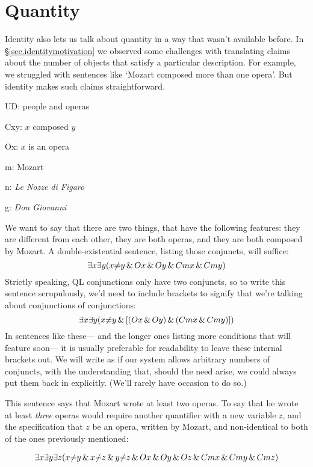\section{Quantity}
\label{sec.quantity}

Identity also lets us talk about quantity in a way that wasn't available before. In \S\ref{sec.identitymotivation} we observed some challenges with translating claims about the number of objects that satisfy a particular description. For example, we struggled with sentences like `Mozart composed more than one opera'. But identity makes such claims straightforward.

\begin{ekey}
\item[UD:] people and operas
\item[Cxy:] $x$ composed $y$
\item[Ox:] $x$ is an opera
\item[m:] Mozart
\item[n:] \emph{Le Nozze di Figaro}
\item[g:] \emph{Don Giovanni}
\end{ekey}

We want to say that there are two things, that have the following features: they are different from each other, they are both operas, and they are both composed by Mozart. A double-existential sentence, listing those conjuncts, will suffice: 
$$\exists x \exists y (x {\neq} y \,\&\, Ox \,\&\, Oy \,\&\, Cmx \,\&\, Cmy)$$
Strictly speaking, QL conjunctions only have two conjuncts, so to write this sentence scrupulously, we'd need to include brackets to signify that we're talking about conjunctions of conjunctions:
$$\exists x \exists y (x {\neq} y \,\&\, [(Ox \,\&\, Oy) \,\&\, (Cmx \,\&\, Cmy)])$$
In sentences like these--- and the longer ones listing more conditions that will feature soon--- it is usually preferable for readability to leave these internal brackets out. We will write as if our system allows arbitrary numbers of conjuncts, with the understanding that, should the need arise, we could always put them back in explicitly. (We'll rarely have occasion to do so.)

This sentence says that Mozart wrote at least two operas. To say that he wrote at least \emph{three} operas would require another quantifier with a new variable $z$, and the specification that $z$ be an opera, written by Mozart, and non-identical to both of the ones previously mentioned:

\begin{multline*}
\exists x \exists y \exists z (x {\neq} y \,\&\, x {\neq} z \,\&\, y {\neq} z \,\&\, 
Ox \,\&\, Oy \,\&\, Oz \,\&\, Cmx \,\&\, Cmy \,\&\, Cmz)
\end{multline*}

